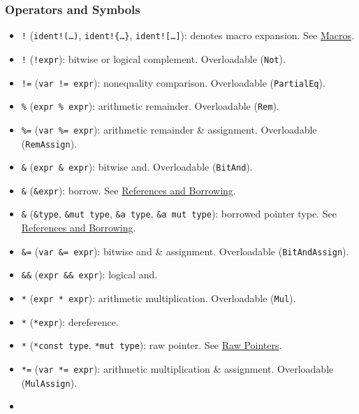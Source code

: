 \documentclass[a4paper,]{book}
\providecommand{\tightlist}{%
  \setlength{\itemsep}{0pt}\setlength{\parskip}{0pt}}
\begin{document}
\subsubsection{Operators and Symbols}\label{operators-and-symbols}

\begin{itemize}
\tightlist
\item
  \texttt{!} (\texttt{ident!(\ldots{})}, \texttt{ident!\{\ldots{}\}},
  \texttt{ident!{[}\ldots{}{]}}): denotes macro expansion. See
  \protect\hyperlink{sec--macros}{Macros}.
\item
  \texttt{!} (\texttt{!expr}): bitwise or logical complement.
  Overloadable (\texttt{Not}).
\item
  \texttt{!=} (\texttt{var\ !=\ expr}): nonequality comparison.
  Overloadable (\texttt{PartialEq}).
\item
  \texttt{\%} (\texttt{expr\ \%\ expr}): arithmetic remainder.
  Overloadable (\texttt{Rem}).
\item
  \texttt{\%=} (\texttt{var\ \%=\ expr}): arithmetic remainder \&
  assignment. Overloadable (\texttt{RemAssign}).
\item
  \texttt{\&} (\texttt{expr\ \&\ expr}): bitwise and. Overloadable
  (\texttt{BitAnd}).
\item
  \texttt{\&} (\texttt{\&expr}): borrow. See
  \protect\hyperlink{sec--references-and-borrowing}{References and
  Borrowing}.
\item
  \texttt{\&} (\texttt{\&type}, \texttt{\&mut\ type},
  \texttt{\&\textquotesingle{}a\ type},
  \texttt{\&\textquotesingle{}a\ mut\ type}): borrowed pointer type. See
  \protect\hyperlink{sec--references-and-borrowing}{References and
  Borrowing}.
\item
  \texttt{\&=} (\texttt{var\ \&=\ expr}): bitwise and \& assignment.
  Overloadable (\texttt{BitAndAssign}).
\item
  \texttt{\&\&} (\texttt{expr\ \&\&\ expr}): logical and.
\item
  \texttt{*} (\texttt{expr\ *\ expr}): arithmetic multiplication.
  Overloadable (\texttt{Mul}).
\item
  \texttt{*} (\texttt{*expr}): dereference.
\item
  \texttt{*} (\texttt{*const\ type}, \texttt{*mut\ type}): raw pointer.
  See \protect\hyperlink{sec--raw-pointers}{Raw Pointers}.
\item
  \texttt{*=} (\texttt{var\ *=\ expr}): arithmetic multiplication \&
  assignment. Overloadable (\texttt{MulAssign}).
\item

\end{itemize}
\end{document}

